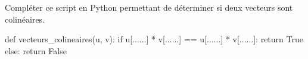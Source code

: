 \documentclass[a4paper]{article}
\begin{document}
    \begin{exercice}{}{}
    Compléter ce script en Python permettant de déterminer si deux vecteurs sont colinéaires.
      \begin{center}
        \begin{CodePythontex}[Largeur=0.75\linewidth, Centre, Lignes=false]{}
          def vecteurs_colineaires(u, v):
          if u[......] * v[......] == u[......] * v[......]:
            return True
          else:
            return False
          \end{CodePythontex}
      \end{center}
    \end{exercice}
\end{document}
